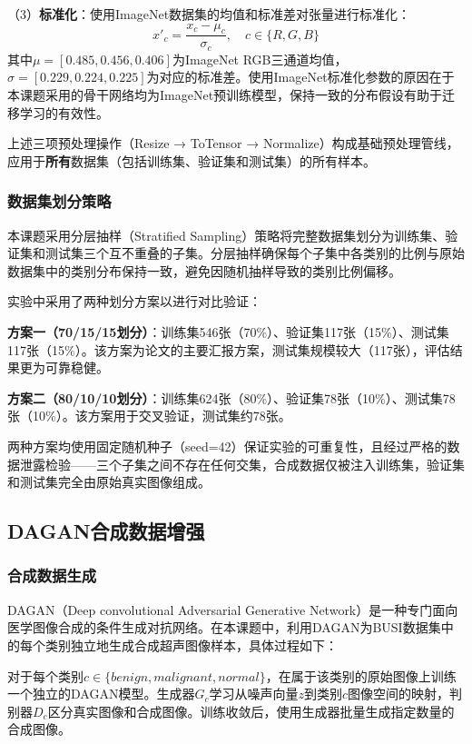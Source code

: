 （3）\textbf{标准化}：使用ImageNet数据集的均值和标准差对张量进行标准化：
\begin{equation}
    \label{eq:norm}
    x'_{c} = \frac{x_c - \mu_c}{\sigma_c}, \quad c \in \{R, G, B\}
\end{equation}
其中$\mu = [0.485, 0.456, 0.406]$为ImageNet RGB三通道均值，$\sigma = [0.229, 0.224, 0.225]$为对应的标准差。使用ImageNet标准化参数的原因在于本课题采用的骨干网络均为ImageNet预训练模型，保持一致的分布假设有助于迁移学习的有效性。

上述三项预处理操作（Resize → ToTensor → Normalize）构成基础预处理管线，应用于\textbf{所有}数据集（包括训练集、验证集和测试集）的所有样本。

\subsubsection{数据集划分策略}

本课题采用分层抽样（Stratified Sampling）策略将完整数据集划分为训练集、验证集和测试集三个互不重叠的子集。分层抽样确保每个子集中各类别的比例与原始数据集中的类别分布保持一致，避免因随机抽样导致的类别比例偏移。

实验中采用了两种划分方案以进行对比验证：

\textbf{方案一（70/15/15划分）}：训练集546张（70\%）、验证集117张（15\%）、测试集117张（15\%）。该方案为论文的主要汇报方案，测试集规模较大（117张），评估结果更为可靠稳健。

\textbf{方案二（80/10/10划分）}：训练集624张（80\%）、验证集78张（10\%）、测试集78张（10\%）。该方案用于交叉验证，测试集约78张。

两种方案均使用固定随机种子（seed=42）保证实验的可重复性，且经过严格的数据泄露检验——三个子集之间不存在任何交集，合成数据仅被注入训练集，验证集和测试集完全由原始真实图像组成。


\subsection{DAGAN合成数据增强}

\subsubsection{合成数据生成}

DAGAN（Deep convolutional Adversarial Generative Network）是一种专门面向医学图像合成的条件生成对抗网络。在本课题中，利用DAGAN为BUSI数据集中的每个类别独立地生成合成超声图像样本，具体过程如下：

对于每个类别$c \in \{benign, malignant, normal\}$，在属于该类别的原始图像上训练一个独立的DAGAN模型。生成器$G_c$学习从噪声向量$z$到类别$c$图像空间的映射，判别器$D_c$区分真实图像和合成图像。训练收敛后，使用生成器批量生成指定数量的合成图像。

